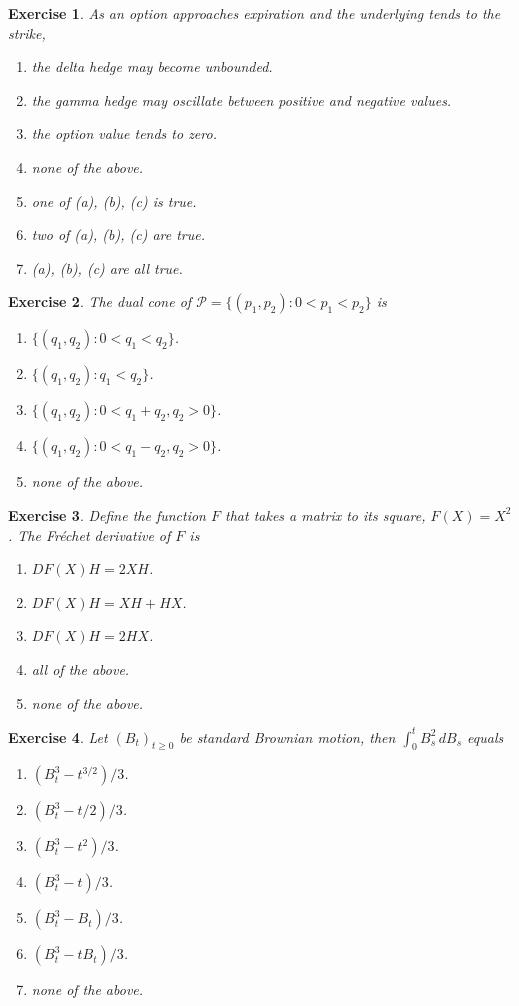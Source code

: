 \documentclass[11pt,fleqn]{amsproc}
\renewcommand{\P}{\mathcal{P}}
\newtheorem{xca}{Exercise}
\begin{document}
\begin{xca}
As an option approaches expiration and the underlying tends to the strike,
\begin{enumerate}
\item the delta hedge may become unbounded.
\item the gamma hedge may oscillate between positive and negative values.
\item the option value tends to zero.
\item none of the above.
\item one of (a), (b), (c) is true.
\item two of (a), (b), (c) are true.
\item (a), (b), (c) are all true.
\end{enumerate}
\end{xca}

\begin{xca}
The dual cone of $\P = \{(p_1,p_2):0<p_1<p_2\}$ is
\begin{enumerate}
\item $\{(q_1,q_2):0<q_1<q_2\}$.
\item $\{(q_1,q_2):q_1<q_2\}$.
\item $\{(q_1,q_2):0<q_1 + q_2,q_2>0\}$.
\item $\{(q_1,q_2):0< q_1- q_2,q_2>0\}$.
\item none of the above.
\end{enumerate}
\end{xca}

\begin{xca}
Define the function $F$ that takes a matrix to its square, $F(X) = X^2$. The Fr\'echet derivative of $F$ is
\begin{enumerate}
\item $DF(X)H = 2XH$.
\item $DF(X)H = XH + HX$.
\item $DF(X)H = 2HX$.
\item all of the above.
\item none of the above.
\end{enumerate}
\end{xca}

\begin{xca}
Let $(B_t)_{t\ge0}$ be standard Brownian motion, then $\int_0^t B_s^2\,dB_s$ equals
\begin{enumerate}
\item $(B^3_t - t^{3/2})/3$.
\item $(B^3_t - t/2)/3$.
\item $(B^3_t - t^2)/3$.
\item $(B^3_t - t)/3$.
\item $(B^3_t - B_t)/3$.
\item $(B^3_t - tB_t)/3$.
\item none of the above.
\end{enumerate}

\end{xca}
\end{document}
